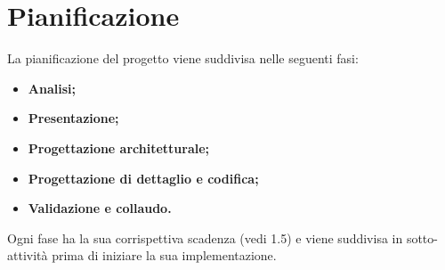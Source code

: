 \section{Pianificazione}

La pianificazione del progetto viene suddivisa nelle seguenti fasi:
\begin{itemize}
	\item \textbf{Analisi;}
	\item \textbf{Presentazione;}
	\item \textbf{Progettazione architetturale;}
	\item \textbf{Progettazione di dettaglio e codifica;}
	\item \textbf{Validazione e collaudo.}
\end{itemize}
Ogni fase ha la sua corrispettiva scadenza (vedi 1.5) e viene suddivisa in sotto-attività prima di iniziare la sua implementazione.
